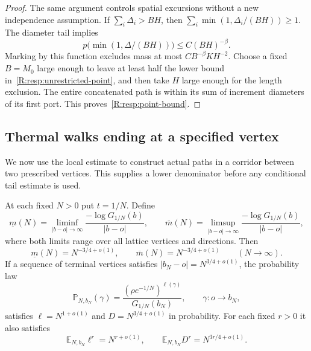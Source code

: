 \begin{proof}
The same argument controls spatial excursions without a new independence assumption. If $\sum_i\Delta_i>BH$, then $\sum_i\min(1,\Delta_i/(BH))\ge1$. The diameter tail implies
\[
 p\bigl(\min(1,\Delta/(BH))\bigr)\le C(BH)^{-\beta}.
\]
Marking by this function excludes mass at most $CB^{-\beta}KH^{-2}$. Choose a fixed $B=M_0$ large enough to leave at least half the lower bound in~\eqref{R:resp:unrestricted-point}, and then take $H$ large enough for the length exclusion. The entire concatenated path is within its sum of increment diameters of its first port. This proves~\eqref{R:resp:point-bound}.
\end{proof}

\subsection{Thermal walks ending at a specified vertex}
We now use the local estimate to construct actual paths in a corridor between two prescribed vertices. This supplies a lower denominator before any conditional tail estimate is used.

\begin{theorem}\label{R:resp:prescribed}
At each fixed $N>0$ put $t=1/N$. Define
\[
 \underline m(N)=\liminf_{|b-o|\to\infty}
        \frac{-\log G_{1/N}(b)}{|b-o|},\qquad
 \overline m(N)=\limsup_{|b-o|\to\infty}
        \frac{-\log G_{1/N}(b)}{|b-o|},
\]
where both limits range over all lattice vertices and directions. Then
\[
 \underline m(N)=N^{-3/4+o(1)},\qquad
 \overline m(N)=N^{-3/4+o(1)}\qquad(N\to\infty).
\]
If a sequence of terminal vertices satisfies $|b_N-o|=N^{3/4+o(1)}$, the probability law
\[
 \mathbb P_{N,b_N}(\gamma)=
       \frac{(\rho e^{-1/N})^{\ell(\gamma)}}{G_{1/N}(b_N)},
       \qquad \gamma:o\to b_N,
\]
satisfies $\ell=N^{1+o(1)}$ and $D=N^{3/4+o(1)}$ in probability. For each fixed $r>0$ it also satisfies
\[
 \mathbb E_{N,b_N}\ell^r=N^{r+o(1)},\qquad
 \mathbb E_{N,b_N}D^r=N^{3r/4+o(1)}.
\]
\end{theorem}

